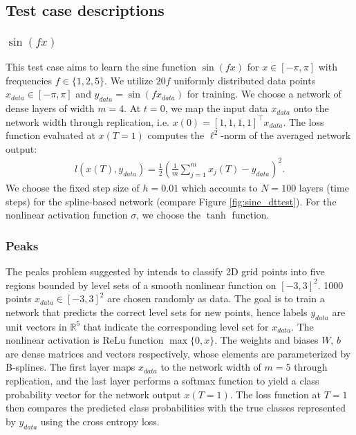 \documentclass[12pt]{amsart}
\newcommand{\R}{\mathds{R}}
\begin{document}
\subsection{Test case descriptions} \label{sec:testcases}
\subsubsection{$\sin(f x)$}\label{sec:sine_example}
This test case aims to learn the sine function $\sin(f x)$ for $x\in [-\pi, \pi]$ with frequencies $f\in \{1,2,5\}$. We utilize $20f$ uniformly distributed data points $x_{data} \in [-\pi,\pi]$ and $y_{data} = \sin(f x_{data})$ for training. We choose a network of dense layers of width $m=4$. At $t=0$, we map the input data $x_{data}$ onto the network width through replication, i.e. $x(0) = [1,1,1,1]^\intercal x_{data}$. The loss function evaluated at $x(T=1)$ computes the $\ell^2$-norm of the averaged network output:
\begin{align}
    l(x(T), y_{data}) = \frac{1}{2} \left(\frac{1}{m}\sum_{j=1}^m x_j(T) - y_{data} \right)^2.
\end{align}
We choose the fixed step size of $h=0.01$ which accounts to $N=100$ layers (time steps) for the spline-based network (compare Figure \ref{fig:sine_dttest}). For the nonlinear activation function $\sigma$, we choose the $\tanh$ function.

\subsubsection{Peaks}
The peaks problem suggested by \cite{haber2017stable} intends to classify 2D grid points into five regions bounded by level sets of a smooth nonlinear function on $[-3,3]^2$.
1000 points $x_{data} \in [-3,3]^2$ are chosen randomly as data.
The goal is to train a network that predicts the correct level sets for new points, hence labels $y_{data}$ are unit vectors in $\R^5$ that indicate the corresponding level set for $x_{data}$.
The nonlinear activation is ReLu function $\max\{0,x\}$.
The weights and biases $W$, $b$ are dense matrices and vectors respectively, whose elements are parameterized by B-splines.
The first layer maps $x_{data}$ to the network width of $m=5$ through replication, and the last layer performs a softmax function to yield a class probability vector for the network output $x(T=1)$.
The loss function at $T=1$ then compares the predicted class probabilities with the true classes represented by $y_{data}$ using the cross entropy loss.
\end{document}
